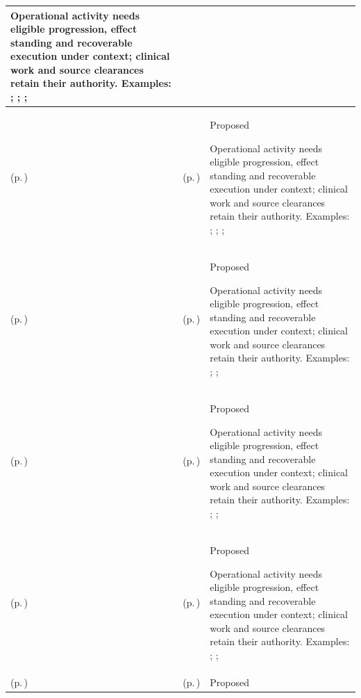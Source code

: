 \begin{longtable}{|>{\raggedright\arraybackslash}p{0.27\TableWidth}|>{\raggedright\arraybackslash}p{0.27\TableWidth}|>{\raggedright\arraybackslash}p{0.46\TableWidth}|}
Operational activity needs eligible progression, effect standing and recoverable execution under context; clinical work and source clearances retain their authority. Examples: \nameref{feature:feat-hso-24}; \nameref{feature:feat-hso-25}; \nameref{function:manage-patient-transport-progression}; \nameref{service:patient-transport-tracking-service}\\\hline
\nameref{cap:bec-patient-transport} (p.\,\pageref{cap:bec-patient-transport}) & \nameref{cap:ec-12} (p.\,\pageref{cap:ec-12}) & Proposed

Operational activity needs eligible progression, effect standing and recoverable execution under context; clinical work and source clearances retain their authority. Examples: \nameref{feature:feat-hso-24}; \nameref{feature:feat-hso-25}; \nameref{function:manage-patient-transport-progression}; \nameref{service:patient-transport-tracking-service}\\\hline
\nameref{cap:bec-clinical-logistics-coordination} (p.\,\pageref{cap:bec-clinical-logistics-coordination}) & \nameref{cap:ec-02} (p.\,\pageref{cap:ec-02}) & Proposed

Operational activity needs eligible progression, effect standing and recoverable execution under context; clinical work and source clearances retain their authority. Examples: \nameref{feature:feat-hso-26}; \nameref{function:manage-specimen-transport-progression}; \nameref{service:specimen-transit-tracking-service}\\\hline
\nameref{cap:bec-clinical-logistics-coordination} (p.\,\pageref{cap:bec-clinical-logistics-coordination}) & \nameref{cap:ec-10} (p.\,\pageref{cap:ec-10}) & Proposed

Operational activity needs eligible progression, effect standing and recoverable execution under context; clinical work and source clearances retain their authority. Examples: \nameref{feature:feat-hso-26}; \nameref{function:manage-specimen-transport-progression}; \nameref{service:specimen-transit-tracking-service}\\\hline
\nameref{cap:bec-clinical-logistics-coordination} (p.\,\pageref{cap:bec-clinical-logistics-coordination}) & \nameref{cap:ec-12} (p.\,\pageref{cap:ec-12}) & Proposed

Operational activity needs eligible progression, effect standing and recoverable execution under context; clinical work and source clearances retain their authority. Examples: \nameref{feature:feat-hso-26}; \nameref{function:manage-specimen-transport-progression}; \nameref{service:specimen-transit-tracking-service}\\\hline
\nameref{cap:bec-discharge-management} (p.\,\pageref{cap:bec-discharge-management}) & \nameref{cap:ec-02} (p.\,\pageref{cap:ec-02}) & Proposed


\end{longtable}
